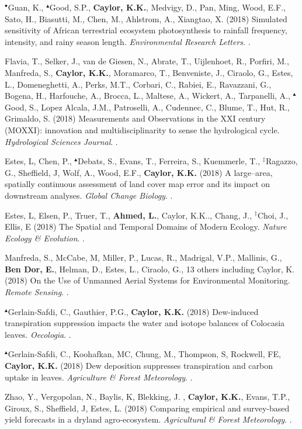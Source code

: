 \begin{etaremune}
\item $^{\bullet}$Guan, K., $^{\blacktriangle}$Good, S.P., \textbf{ Caylor, K.K.}, Medvigy, D., Pan, Ming, Wood, E.F., Sato, H., Biasutti, M., Chen, M., Ahlstrom, A., Xiangtao, X. (2018) Simulated sensitivity of African terrestrial ecosystem photosynthesis to rainfall frequency, intensity, and rainy season length. \emph{Environmental Research Letters}. .
\item Flavia, T., Selker, J., van de Giesen, N., Abrate, T., Uijlenhoet, R., Porfiri, M., Manfreda, S., \textbf{ Caylor, K.K.}, Moramarco, T., Benveniste, J., Ciraolo, G., Estes, L., Domeneghetti, A., Perks, M.T., Corbari, C., Rabiei, E., Ravazzani, G., Bogena, H., Harfouche, A., Brocca, L., Maltese, A., Wickert, A., Tarpanelli, A., $^{\blacktriangle}$Good, S., Lopez Alcala, J.M., Patroselli, A., Cudennec, C., Blume, T., Hut, R., Grimaldo, S. (2018) Measurements and Observations in the XXI century (MOXXI): innovation and multidisciplinarity to sense the hydrological cycle. \emph{Hydrological Sciences Journal}. .
\item Estes, L, Chen, P., $^{\blacktriangle}$Debats, S., Evans, T., Ferreira, S., Kuemmerle, T., $^{\ddagger}$Ragazzo, G., Sheffield, J, Wolf, A., Wood, E.F., \textbf{ Caylor, K.K.} (2018) A large--area, spatially continuous assessment of land cover map error and its impact on downstream analyses. \emph{Global Change Biology}. .
\item Estes, L, Elsen, P., Truer, T., \textbf{ Ahmed, L.}, Caylor, K.K.., Chang, J., $^{\ddagger}$Choi, J., Ellis, E (2018) The Spatial and Temporal Domains of Modern Ecology. \emph{Nature Ecology \& Evolution}. .
\item Manfreda, S., McCabe, M, Miller, P., Lucas, R., Madrigal, V.P., Mallinis, G., \textbf{ Ben Dor, E.}, Helman, D., Estes, L., Ciraolo, G., 13 others including Caylor, K. (2018) On the Use of Unmanned Aerial Systems for Environmental Monitoring. \emph{Remote Sensing}. .
\item $^{\blacktriangle}$Gerlain-Safdi, C., Gauthier, P.G., \textbf{ Caylor, K.K.} (2018) Dew-induced transpiration suppression impacts the water and isotope balances of Colocasia leaves. \emph{Oecologia}. .
\item $^{\blacktriangle}$Gerlain-Safdi, C., Koohafkan, MC, Chung, M., Thompson, S, Rockwell, FE, \textbf{ Caylor, K.K.} (2018) Dew deposition suppresses transpiration and carbon uptake in leaves. \emph{Agriculture \& Forest Meteorology}. .
\item Zhao, Y., Vergopolan, N., Baylis, K, Blekking, J. , \textbf{ Caylor, K.K.}, Evans, T.P., Giroux, S., Sheffield, J, Estes, L. (2018) Comparing empirical and survey-based yield forecasts in a dryland agro-ecosystem. \emph{Agricultural \& Forest Meteorology}. .


\end{etaremune}
